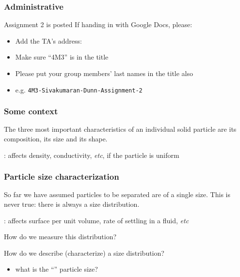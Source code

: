 \begin{frame}\frametitle{Administrative}
	Assignment 2 is posted
	\vspace{12pt}
	If handing in with Google Docs, please:
	\begin{itemize}
		\item	Add the TA's address: {}
		\item	Make sure ``4M3'' is in the title
		\item	Please put your group members' last names in the title also
		\item	e.g. \texttt{4M3-Sivakumaran-Dunn-Assignment-2}
	\end{itemize}
\end{frame}

\begin{frame}\frametitle{Some context}
	\begin{exampleblock}{}
		The three most important characteristics of an individual solid particle are its composition, its size and its shape. 
	\end{exampleblock}
	
	
	\vspace{12pt}
	{\color{myGreen}{Composition}}: affects density, conductivity, \emph{etc}, if the particle is uniform	
\end{frame}

\begin{frame}\frametitle{Particle size characterization}
	So far we have assumed particles to be separated are of a single size. This is never true: there is always a size distribution.
	
	\vspace{12pt}
	{\color{myGreen}{Particle size}}: affects surface per unit volume, rate of settling in a fluid, \emph{etc}
	
	\vspace{12pt}	
	\begin{exampleblock}{{\color{myRed}{Aims}}}
		\vspace{12pt}
		How do we measure this distribution?
		
		\vspace{12pt}
		How do we describe (characterize) a size distribution? 
	\end{exampleblock}
	\begin{itemize}
		\item	what is the ``\textbf{{\color{Brown}{average}}}'' particle size?
	\end{itemize}
\end{frame}

